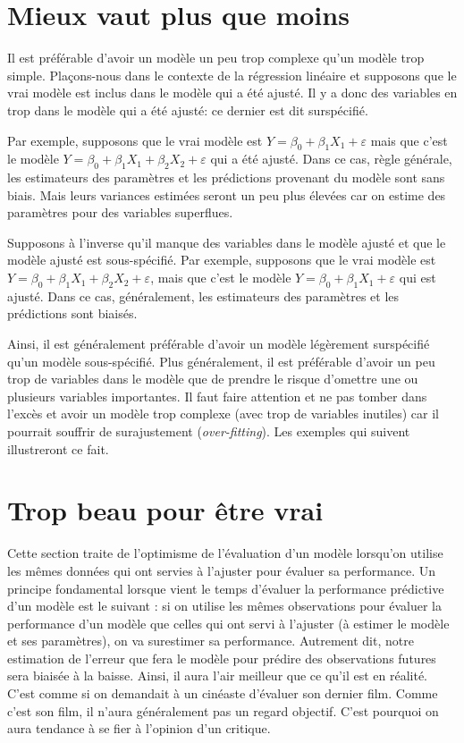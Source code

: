 \documentclass[
  11pt,
  letterpaper,
]{book}
\theoremstyle{definition}
\theoremstyle{definition}
\theoremstyle{definition}
\theoremstyle{remark}
\begin{document}
\hypertarget{mieux-vaut-plus-que-moins}{%
\section{Mieux vaut plus que moins}\label{mieux-vaut-plus-que-moins}}

Il est préférable d'avoir un modèle un peu trop complexe qu'un modèle trop simple. Plaçons-nous dans le contexte de la régression linéaire et supposons que le vrai modèle est inclus dans le modèle qui a été ajusté. Il y a donc des variables en trop dans le modèle qui a été ajusté: ce dernier est dit surspécifié.

Par exemple, supposons que le vrai modèle est \(Y=\beta_0+\beta_1X_1+\varepsilon\) mais que c'est le modèle \(Y=\beta_0+\beta_1X_1+\beta_2X_2+\varepsilon\) qui a été ajusté. Dans ce cas, règle générale, les estimateurs des paramètres et les prédictions provenant du modèle sont sans biais. Mais leurs variances estimées seront un peu plus élevées car on estime des paramètres pour des variables superflues.

Supposons à l'inverse qu'il manque des variables dans le modèle ajusté et que le modèle ajusté est sous-spécifié. Par exemple, supposons que le vrai modèle est \(Y=\beta_0+\beta_1X_1+\beta_2X_2+\varepsilon\), mais que c'est le modèle \(Y=\beta_0+\beta_1X_1+\varepsilon\) qui est ajusté. Dans ce cas, généralement, les estimateurs des paramètres et les prédictions sont biaisés.

Ainsi, il est généralement préférable d'avoir un modèle légèrement surspécifié qu'un modèle sous-spécifié. Plus généralement, il est préférable d'avoir un peu trop de variables dans le modèle que de prendre le risque d'omettre une ou plusieurs variables importantes. Il faut faire attention et ne pas tomber dans l'excès et avoir un modèle trop complexe (avec trop de variables inutiles) car il pourrait souffrir de surajustement (\emph{over-fitting}). Les exemples qui suivent illustreront ce fait.

\hypertarget{trop-beau-pour-uxeatre-vrai}{%
\section{Trop beau pour être vrai}\label{trop-beau-pour-uxeatre-vrai}}

Cette section traite de l'optimisme de l'évaluation d'un modèle lorsqu'on utilise les mêmes données qui ont servies à l'ajuster pour évaluer sa performance. Un principe fondamental lorsque vient le temps d'évaluer la performance prédictive d'un modèle est le suivant : si on utilise les mêmes observations pour évaluer la performance d'un modèle que celles qui ont servi à l'ajuster (à estimer le modèle et ses paramètres), on va surestimer sa performance. Autrement dit, notre estimation de l'erreur que fera le modèle pour prédire des observations futures sera biaisée à la baisse. Ainsi, il aura l'air meilleur que ce qu'il est en réalité. C'est comme si on demandait à un cinéaste d'évaluer son dernier film. Comme c'est son film, il n'aura généralement pas un regard objectif. C'est pourquoi on aura tendance à se fier à l'opinion d'un critique.
\end{document}
